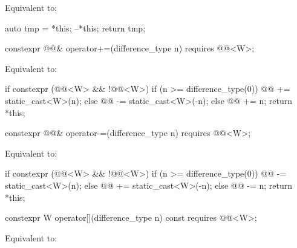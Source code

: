 \begin{itemdescr}
\pnum
\effects
Equivalent to:
\begin{codeblock}
auto tmp = *this;
--*this;
return tmp;
\end{codeblock}
\end{itemdescr}

\begin{itemdecl}
constexpr @@& operator+=(difference_type n)
  requires @@<W>;
\end{itemdecl}

\begin{itemdescr}
\pnum
\effects
Equivalent to:
\begin{codeblock}
if constexpr (@@<W> && !@@<W>) {
  if (n >= difference_type(0))
    @@ += static_cast<W>(n);
  else
    @@ -= static_cast<W>(-n);
} else {
  @@ += n;
}
return *this;
\end{codeblock}
\end{itemdescr}

\begin{itemdecl}
constexpr @@& operator-=(difference_type n)
  requires @@<W>;
\end{itemdecl}

\begin{itemdescr}
\pnum
\effects
Equivalent to:
\begin{codeblock}
if constexpr (@@<W> && !@@<W>) {
  if (n >= difference_type(0))
    @@ -= static_cast<W>(n);
  else
    @@ += static_cast<W>(-n);
} else {
  @@ -= n;
}
return *this;
\end{codeblock}
\end{itemdescr}

\begin{itemdecl}
constexpr W operator[](difference_type n) const
  requires @@<W>;
\end{itemdecl}

\begin{itemdescr}
\pnum
\effects
Equivalent to: 
\end{itemdescr}

